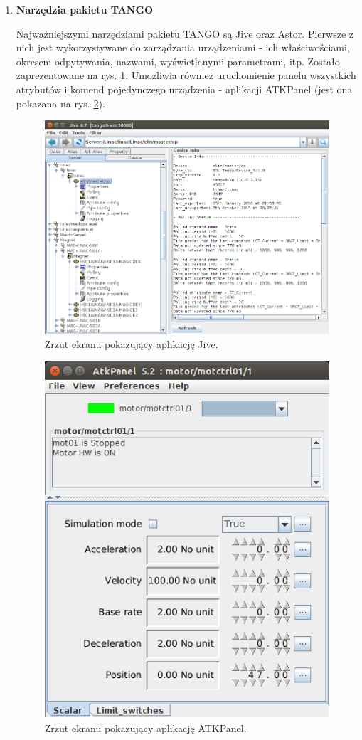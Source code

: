 \begin{enumerate}
\begin{enumerate}
		\item \textbf{Narzędzia pakietu TANGO}
		
		\hspace{2em}Najważniejszymi narzędziami pakietu TANGO są Jive oraz Astor. Pierwsze z nich jest wykorzystywane do zarządzania urządzeniami - ich właściwościami, okresem odpytywania, nazwami, wyświetlanymi parametrami, itp. Zostało zaprezentowane na rys. \ref{fig:jive}. Umożliwia również uruchomienie panelu wszystkich atrybutów i komend pojedynczego urządzenia - aplikacji ATKPanel (jest ona pokazana na rys. \ref{fig:atk}).
		
		\begin{figure}[pth]
			\centering
			\includegraphics[width=1\linewidth]{Grafika/jive}
			\caption{Zrzut ekranu pokazujący aplikację Jive.}
			\label{fig:jive}
		\end{figure}
		
		\begin{figure}[pth]
			\centering
			\includegraphics[width=0.5\linewidth]{Grafika/atk}
			\caption{Zrzut ekranu pokazujący aplikację ATKPanel.}
			\label{fig:atk}
		\end{figure}
		

\end{enumerate}
\end{enumerate}
